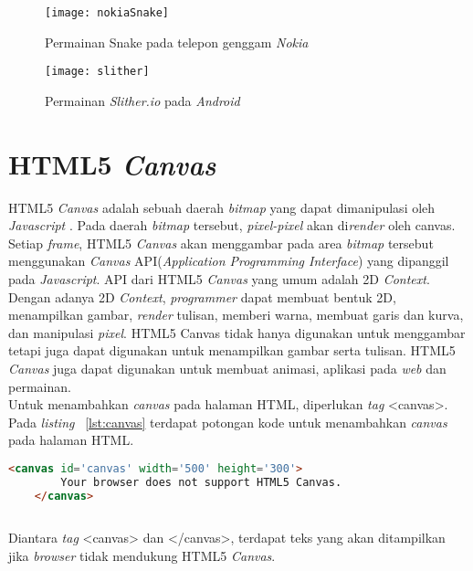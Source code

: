 \begin{figure}[H]
	\centering  
	\texttt{[image: nokiaSnake]}  
	\caption[Permainan Snake pada telepon genggam \textit{Nokia}]{Permainan Snake pada telepon genggam \textit{Nokia}} 
	\label{fig:nokiaSnake} 
\end{figure} 

\begin{figure}[H]
	\centering  
	\texttt{[image: slither]}  
	\caption[Permainan \textit{Slither.io} pada \textit{Android}]{Permainan \textit{Slither.io} pada \textit{Android}} 
	\label{fig:slither} 
\end{figure} 

\section{HTML5 \textit{Canvas}}
\label{sec:HTML5Canvas}
HTML5 \textit{Canvas} adalah sebuah daerah \textit{bitmap} yang dapat dimanipulasi oleh \textit{Javascript} \cite{fulton2013html5}. Pada daerah \textit{bitmap} tersebut, \textit{pixel-pixel} akan di\textit{render} oleh canvas. Setiap \textit{frame}, HTML5 \textit{Canvas} akan menggambar pada area \textit{bitmap} tersebut menggunakan \textit{Canvas} API(\textit{Application Programming Interface}) yang dipanggil pada \textit{Javascript}. API dari HTML5 \textit{Canvas} yang umum adalah 2D \textit{Context}. Dengan adanya 2D \textit{Context}, \textit{programmer} dapat membuat bentuk 2D, menampilkan gambar, \textit{render} tulisan, memberi warna, membuat garis dan kurva, dan manipulasi \textit{pixel}. HTML5 Canvas tidak hanya digunakan untuk menggambar tetapi juga dapat digunakan untuk menampilkan gambar serta tulisan. HTML5 \textit{Canvas} juga dapat digunakan untuk membuat animasi, aplikasi pada \textit{web} dan permainan. \\

Untuk menambahkan \textit{canvas} pada halaman HTML, diperlukan \textit{tag} <canvas>. Pada \textit{listing} ~\ref{lst:canvas} terdapat potongan kode untuk menambahkan \textit{canvas} pada halaman HTML. 

\begin{lstlisting}[language=HTML, caption=Menambahkan \textit{canvas}, label={lst:canvas}]
	<canvas id='canvas' width='500' height='300'>
		Your browser does not support HTML5 Canvas.
	</canvas>
	
\end{lstlisting}

Diantara \textit{tag} <canvas> dan </canvas>, terdapat teks yang akan ditampilkan jika \textit{browser} tidak mendukung HTML5 \textit{Canvas}. 

